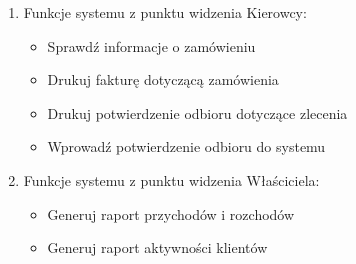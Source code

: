 \begin{enumerate}
\item Funkcje systemu z punktu widzenia Kierowcy:
	\begin{itemize}
		\item Sprawdź informacje o zamówieniu
		\item Drukuj fakturę dotyczącą zamówienia
		\item Drukuj potwierdzenie odbioru dotyczące zlecenia
		\item Wprowadź potwierdzenie odbioru do systemu
	\end{itemize}

\item Funkcje systemu z punktu widzenia Właściciela:
	\begin{itemize}
		\item Generuj raport przychodów i rozchodów
		\item Generuj raport aktywności klientów
	\end{itemize}

\end{enumerate}

